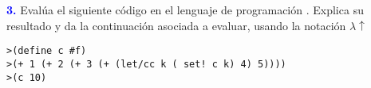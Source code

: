 \Large\textbf{\textcolor{blue}{3.}}
Evalúa el siguiente código en el lenguaje de programación . Explica su resultado 
y da la continuación asociada a evaluar, usando la notación $\lambda\uparrow$
\begin{lstlisting}
>(define c #f)
>(+ 1 (+ 2 (+ 3 (+ (let/cc k ( set! c k) 4) 5))))
>(c 10)
\end{lstlisting}